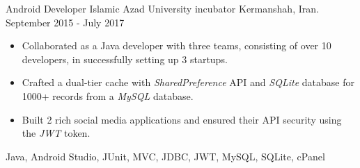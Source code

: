 \begin{experiences}
\emptySeparator

\experience
{}
{Android Developer}
{Islamic Azad University incubator}
{Kermanshah, Iran. \hspace{60 pt} September 2015 - July 2017}
{}
{
\begin{itemize}
\item Collaborated as a Java developer with three teams, consisting of over 10 developers, in successfully setting up 3 startups.
\item Crafted a dual-tier cache with \emph{SharedPreference} API and \emph{SQLite} database for 1000+ records from a \emph{MySQL} database.
\item Built 2 rich social media applications and ensured their API security using the \emph{JWT} token.
\end{itemize}
}{Java, Android Studio, JUnit, MVC, JDBC, JWT, MySQL, SQLite, cPanel}
\end{experiences}